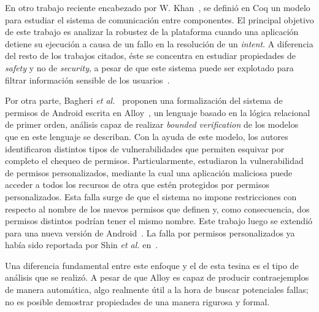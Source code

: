 En otro trabajo reciente encabezado por W. Khan~\cite{crashsafe}, se definió en
Coq un modelo para estudiar el sistema de comunicación entre componentes. El
principal objetivo de este trabajo es analizar la robustez de la plataforma
cuando una aplicación detiene su ejecución a causa de un fallo en la resolución
de un \textit{intent}. A diferencia del resto de los trabajos citados, éste se
concentra en estudiar propiedades de \textit{safety} y no de \textit{security}, a
pesar de que este sistema puede ser explotado para filtrar información sensible de
los usuarios~\cite{iccta}.
%

Por otra parte, Bagheri \textit{et al.}~\cite{bagheri15} proponen una
formalización del sistema de permisos de Android escrita en Alloy~\cite{alloy},
un lenguaje basado en la lógica relacional de primer orden,
%
%
análisis capaz de realizar \textit{bounded verification} de los modelos que en
este lenguaje se describan. Con la ayuda de este modelo, los autores
identificaron distintos tipos de vulnerabilidades que permiten esquivar por
completo el chequeo de permisos. Particularmente, estudiaron la vulnerabilidad
de permisos personalizados, mediante la cual una aplicación maliciosa puede
acceder a todos los recursos de otra que estén protegidos por permisos
personalizados. Esta falla surge de que el sistema no impone restricciones con
respecto al nombre de los nuevos permisos que definen y, como consecuencia, dos
permisos distintos podrían tener el mismo nombre. Este trabajo luego se extendió
para una nueva versión de Android~\cite{bagheri}. La falla por permisos
personalizados ya había sido reportada por Shin \textit{et al.}
en~\cite{shin-custom}.

Una diferencia fundamental entre este enfoque y el de esta tesina es el tipo de
análisis que se realizó. A pesar de que Alloy es capaz de producir
contraejemplos de manera automática, algo realmente útil a la hora de buscar
potenciales fallas; no es posible demostrar propiedades de una manera rigurosa y
formal.



